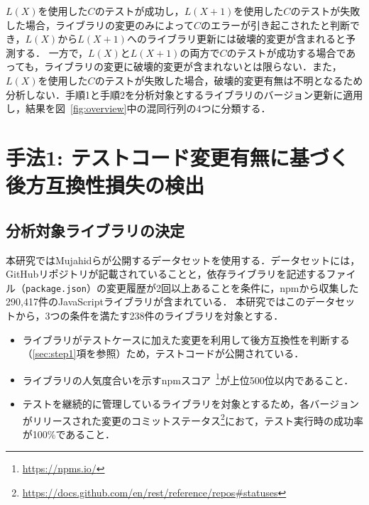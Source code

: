 \documentclass[submit]{ipsj}
\begin{document}
$L(X)$を使用した$C$のテストが成功し，$L(X+1)$を使用した$C$のテストが失敗した場合，ライブラリの変更のみによって$C$のエラーが引き起こされたと判断でき，$L(X)$から$L(X+1)$へのライブラリ更新には破壊的変更が含まれると予測する．
一方で，$L(X)$と$L(X+1)$の両方で$C$のテストが成功する場合であっても，ライブラリの変更に破壊的変更が含まれないとは限らない．また，$L(X)$を使用した$C$のテストが失敗した場合，破壊的変更有無は不明となるため分析しない．手順1と手順2を分析対象とするライブラリのバージョン更新に適用し，結果を図~\ref{fig:overview}中の混同行列の4つに分類する．


\section{手法1: テストコード変更有無に基づく後方互換性損失の検出}
\label{sec:prepare}


\subsection{分析対象ライブラリの決定}
本研究ではMujahidらが公開するデータセット\cite{mujahid}を使用する．データセットには，GitHubリポジトリが記載されていることと，依存ライブラリを記述するファイル（{\verb|package.json|}）の変更履歴が2回以上あることを条件に，npmから収集した290,417件のJavaScriptライブラリが含まれている．
本研究ではこのデータセットから，3つの条件を満たす238件のライブラリを対象とする．

\begin{itemize}
\item ライブラリがテストケースに加えた変更を利用して後方互換性を判断する（\ref{sec:step1}項を参照）ため，テストコードが公開されている．
\item ライブラリの人気度合いを示すnpmスコア~\footnote{\url{https://npms.io/}}が上位500位以内であること．
\item テストを継続的に管理しているライブラリを対象とするため，各バージョンがリリースされた変更のコミットステータス\footnote{\url{https://docs.github.com/en/rest/reference/repos#statuses}}におて，テスト実行時の成功率が100\%であること．
\end{itemize}

\end{document}
